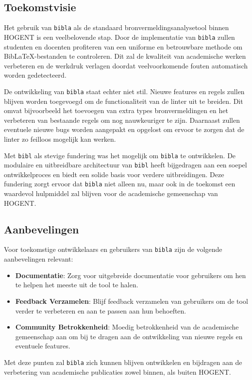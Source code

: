 \subsection{Toekomstvisie}
Het gebruik van \texttt{bibla} als de standaard bronvermeldingsanalysetool binnen HOGENT is een veelbelovende stap. Door de implementatie van \texttt{bibla} zullen studenten en docenten profiteren van een uniforme en betrouwbare methode om BibLaTeX-bestanden te controleren. Dit zal de kwaliteit van academische werken verbeteren en de werkdruk verlagen doordat veelvoorkomende fouten automatisch worden gedetecteerd.

De ontwikkeling van \texttt{bibla} staat echter niet stil. Nieuwe features en regels zullen blijven worden toegevoegd om de functionaliteit van de linter uit te breiden. Dit omvat bijvoorbeeld het toevoegen van extra types bronvermeldingen en het verbeteren van bestaande regels om nog nauwkeuriger te zijn. Daarnaast zullen eventuele nieuwe bugs worden aangepakt en opgelost om ervoor te zorgen dat de linter zo feilloos mogelijk kan werken.

Met \texttt{bibl} als stevige fundering was het mogelijk om \texttt{bibla} te ontwikkelen. De modulaire en uitbreidbare architectuur van \texttt{bibl} heeft bijgedragen aan een soepel ontwikkelproces en biedt een solide basis voor verdere uitbreidingen. Deze fundering zorgt ervoor dat \texttt{bibla} niet alleen nu, maar ook in de toekomst een waardevol hulpmiddel zal blijven voor de academische gemeenschap van HOGENT.

\subsection{Aanbevelingen}

Voor toekomstige ontwikkelaars en gebruikers van \texttt{bibla} zijn de volgende aanbevelingen relevant:
\begin{itemize}
  \item \textbf{Documentatie}: Zorg voor uitgebreide documentatie voor gebruikers om hen te helpen het meeste uit de tool te halen.
  \item \textbf{Feedback Verzamelen}: Blijf feedback verzamelen van gebruikers om de tool verder te verbeteren en aan te passen aan hun behoeften.
  \item \textbf{Community Betrokkenheid}: Moedig betrokkenheid van de academische gemeenschap aan om bij te dragen aan de ontwikkeling van nieuwe regels en eventuele features.
\end{itemize}

Met deze punten zal \texttt{bibla} zich kunnen blijven ontwikkelen en bijdragen aan de verbetering van academische publicaties zowel binnen, als buiten HOGENT.
